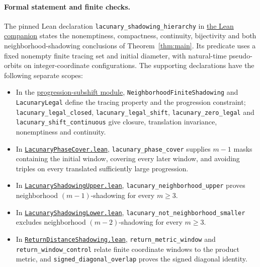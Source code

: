 \documentclass[11pt]{article}
\begin{document}
\paragraph{Formal statement and finite checks.}
The pinned Lean declaration
\nolinkurl{lacunary_shadowing_hierarchy} in
\href{https://github.com/the-omega-institute/trureturing/blob/147008bff5524a3dccf0efa3ed9e76fb6b168a50/D5/S1/Dynamics/Shadowing/LacunaryShadowingHierarchy.lean}{the Lean companion}
states the nonemptiness, compactness, continuity, bijectivity and both
neighborhood-shadowing conclusions of Theorem~\ref{thm:main}.
Its predicate uses a fixed nonempty finite tracing set and initial diameter,
with natural-time pseudo-orbits on integer-coordinate configurations.
The supporting declarations have the following separate scopes:
\begin{itemize}
\item In the \href{https://github.com/the-omega-institute/trureturing/blob/147008bff5524a3dccf0efa3ed9e76fb6b168a50/D5/S1/Dynamics/Shadowing/LacunaryProgressionSubshift.lean}{progression-subshift module},
\nolinkurl{NeighborhoodFiniteShadowing} and \nolinkurl{LacunaryLegal}
define the tracing property and the progression constraint;
\nolinkurl{lacunary_legal_closed}, \nolinkurl{lacunary_legal_shift},
\nolinkurl{lacunary_zero_legal} and \nolinkurl{lacunary_shift_continuous}
give closure, translation invariance, nonemptiness and continuity.
\item In \href{https://github.com/the-omega-institute/trureturing/blob/147008bff5524a3dccf0efa3ed9e76fb6b168a50/D5/S1/Dynamics/Shadowing/LacunaryPhaseCover.lean}{\texttt{LacunaryPhaseCover.lean}},
\nolinkurl{lacunary_phase_cover} supplies $m-1$ masks containing the
initial window, covering every later window, and avoiding triples on
every translated sufficiently large progression.
\item In \href{https://github.com/the-omega-institute/trureturing/blob/147008bff5524a3dccf0efa3ed9e76fb6b168a50/D5/S1/Dynamics/Shadowing/LacunaryShadowingUpper.lean}{\texttt{LacunaryShadowingUpper.lean}},
\nolinkurl{lacunary_neighborhood_upper} proves neighborhood
$(m-1)$-shadowing for every $m\geq3$.
\item In \href{https://github.com/the-omega-institute/trureturing/blob/147008bff5524a3dccf0efa3ed9e76fb6b168a50/D5/S1/Dynamics/Shadowing/LacunaryShadowingLower.lean}{\texttt{LacunaryShadowingLower.lean}},
\nolinkurl{lacunary_not_neighborhood_smaller} excludes neighborhood
$(m-2)$-shadowing for every $m\geq3$.
\item In \href{https://github.com/the-omega-institute/trureturing/blob/147008bff5524a3dccf0efa3ed9e76fb6b168a50/D5/S1/Dynamics/Shadowing/ReturnDistanceShadowing.lean}{\texttt{ReturnDistanceShadowing.lean}},
\nolinkurl{return_metric_window} and \nolinkurl{return_window_control}
relate finite coordinate windows to the product metric, and
\nolinkurl{signed_diagonal_overlap} proves the signed diagonal identity.
\end{itemize}
\end{document}

